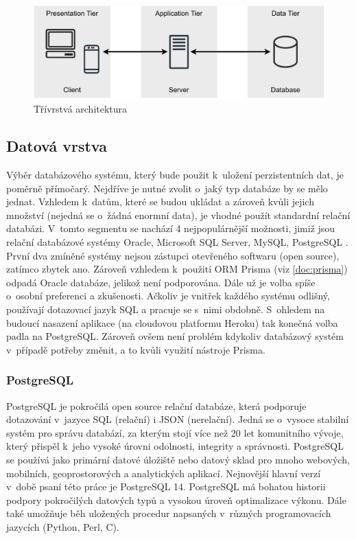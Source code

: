 \documentclass[thesis=M,czech]{FITthesis}[2019/12/23]
\begin{document}
\begin{figure}
	\centering
	\includegraphics[width=1\linewidth]{images/three-tier-architecture.pdf}
  	\caption{Třívrstvá architektura}
  	\label{img:three-tier-architecture}
\end{figure}

\subsection{Datová vrstva}
Výběr databázového systému, který bude použit k~uložení perzistentních dat, je poměrně přímočarý. Nejdříve je nutné zvolit o~jaký typ databáze by se mělo jednat. Vzhledem k~datům, které se budou ukládat a zároveň kvůli jejich množství (nejedná se o~žádná enormní data), je vhodné použít standardní relační databázi. V~tomto segmentu se nachází 4 nejpopulárnější možnosti, jimiž jsou relační databázové systémy Oracle, Microsoft SQL Server, MySQL, PostgreSQL \cite{database-layer}. První dva zmíněné systémy nejsou zástupci otevřeného softwaru (open source), zatímco zbytek ano. Zároveň vzhledem k~použití ORM Prisma (viz \ref{doc:prisma}) odpadá Oracle databáze, jelikož není podporována. Dále už je volba spíše o~osobní preferenci a zkušenosti. Ačkoliv je vnitřek každého systému odlišný, používají dotazovací jazyk SQL a pracuje se s~nimi obdobně. S~ohledem na budoucí nasazení aplikace (na cloudovou platformu Heroku) tak konečná volba padla na PostgreSQL. Zároveň ovšem není problém kdykoliv databázový systém v~případě potřeby změnit, a to kvůli využití nástroje Prisma.

\subsubsection{PostgreSQL}
PostgreSQL je pokročilá open source relační databáze, která podporuje dotazování v~jazyce SQL (relační) i JSON (nerelační). Jedná se o~vysoce stabilní systém pro správu databází, za kterým stojí více než 20 let komunitního vývoje, který přispěl k~jeho vysoké úrovni odolnosti, integrity a správnosti. PostgreSQL se používá jako primární datové úložiště nebo datový sklad pro mnoho webových, mobilních, geoprostorových a analytických aplikací. Nejnovější hlavní verzí v~době psaní této práce je PostgreSQL 14. PostgreSQL má bohatou historii podpory pokročilých datových typů a vysokou úroveň optimalizace výkonu. Dále také umožňuje běh uložených procedur napsaných v~různých programovacích jazycích (Python, Perl, C). \cite{postgresql-1, postgresql-2}
\end{document}
